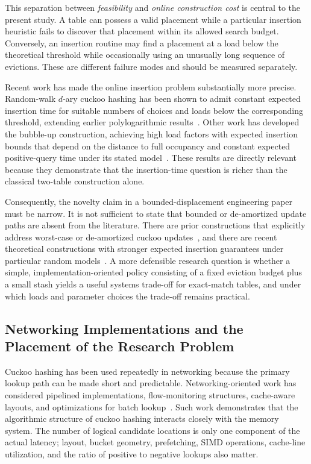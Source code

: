\documentclass[conference]{IEEEtran}
\begin{document}
This separation between \emph{feasibility} and \emph{online construction cost} is central to the present study. A table can possess a valid placement while a particular insertion heuristic fails to discover that placement within its allowed search budget. Conversely, an insertion routine may find a placement at a load below the theoretical threshold while occasionally using an unusually long sequence of evictions. These are different failure modes and should be measured separately.

Recent work has made the online insertion problem substantially more precise. Random-walk $d$-ary cuckoo hashing has been shown to admit constant expected insertion time for suitable numbers of choices and loads below the corresponding threshold, extending earlier polylogarithmic results~\cite{bell2024constant,walzer2022insertion,fountoulakis2010insertion}. Other work has developed the bubble-up construction, achieving high load factors with expected insertion bounds that depend on the distance to full occupancy and constant expected positive-query time under its stated model~\cite{kuszmaul2025bubbling}. These results are directly relevant because they demonstrate that the insertion-time question is richer than the classical two-table construction alone.

Consequently, the novelty claim in a bounded-displacement engineering paper must be narrow. It is not sufficient to state that bounded or de-amortized update paths are absent from the literature. There are prior constructions that explicitly address worst-case or de-amortized cuckoo updates~\cite{arbitman2009deamortized}, and there are recent theoretical constructions with stronger expected insertion guarantees under particular random models~\cite{bell2024constant,kuszmaul2025bubbling}. A more defensible research question is whether a simple, implementation-oriented policy consisting of a fixed eviction budget plus a small stash yields a useful systems trade-off for exact-match tables, and under which loads and parameter choices the trade-off remains practical.

\subsection{Networking Implementations and the Placement of the Research Problem}

Cuckoo hashing has been used repeatedly in networking because the primary lookup path can be made short and predictable. Networking-oriented work has considered pipelined implementations, flow-monitoring structures, cache-aware layouts, and optimizations for batch lookup~\cite{pontarelli2016parallel,pontarelli2016cuckoocache,lescouarnec2018cuckoopp}. Such work demonstrates that the algorithmic structure of cuckoo hashing interacts closely with the memory system. The number of logical candidate locations is only one component of the actual latency; layout, bucket geometry, prefetching, SIMD operations, cache-line utilization, and the ratio of positive to negative lookups also matter.
\end{document}

